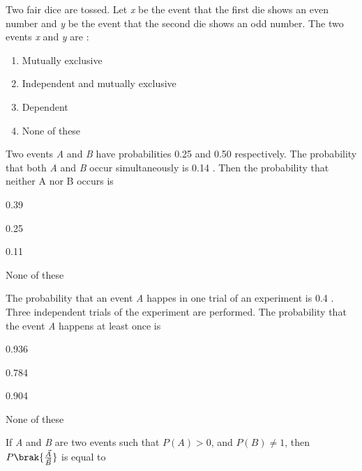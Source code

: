 \iffalse

\title{ASSIGNMENT2 - PROBABILITY}
\author{EE24BTECH11012 - Bhavanisankar G S}
\section{mcq-single}
\fi 
	\item Two fair dice are tossed. Let \emph{x} be the event that the first die shows an even number and \emph{y} be the event that the second die shows an odd number. The two events \emph{x} and \emph{y} are : \hfill{}
  \begin{enumerate}
\item Mutually exclusive \item Independent and mutually exclusive  \item Dependent   \item None of these
\end{enumerate}
\item Two events \emph{A} and \emph{B} have probabilities 0.25 and 0.50 respectively. The probability that both \emph{A} and \emph{B} occur simultaneously is 0.14 . Then the probability that neither A nor B occurs is \hfill{}
\begin{enumerate}
\begin{multicols}{2}
\item 0.39  \item 0.25  \item 0.11  \item None of these
\end{multicols}
\end{enumerate}
\item The probability that an event \emph{A} happes in one trial of an experiment is 0.4 . Three independent trials of the experiment are performed. The probability that the event \emph{A} happens at least once is \hfill{}
\begin{enumerate}
\begin{multicols}{2}
\item 0.936  \item 0.784  \item 0.904  \item None of these
\end{multicols}
\end{enumerate}
\item If \emph{A} and \emph{B} are two events such that $ P(A) >0 $, and $ P(B) \neq1 $, then $ P \brak{\frac{\vec{A}}{\vec{B}}}$ is equal to \hfill{}
